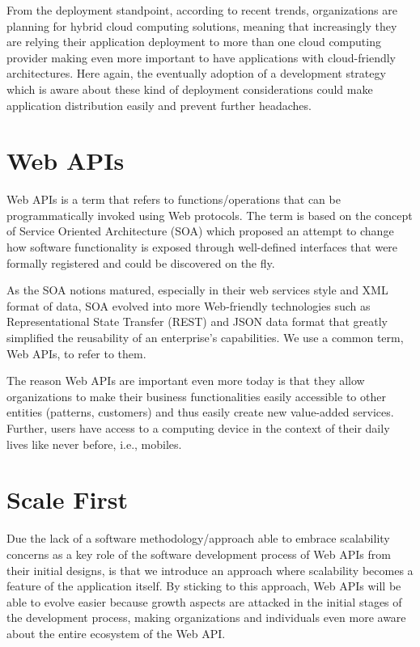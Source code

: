 \documentclass[10pt,article]{IEEEtran}
\begin{document}
From the deployment standpoint, according to recent trends, organizations are planning for hybrid cloud computing solutions, meaning that increasingly they are relying their application deployment to more than one cloud computing provider\cite{rightscale} making even more important to have applications with cloud-friendly architectures. Here again, the eventually adoption of a development strategy which is aware about these kind of deployment considerations could make application distribution easily and prevent further headaches.
 

\section{Web APIs}
Web APIs is a term that refers to functions/operations that can be programmatically invoked using Web protocols. The term is based on the concept of Service Oriented Architecture (SOA) which proposed an attempt to change how software functionality is exposed through well-defined interfaces that were formally registered and could be discovered on the fly.

As the SOA notions matured, especially in their web services style and XML format of data, SOA evolved into more Web-friendly technologies such as Representational State Transfer (REST) and JSON data format that greatly simplified the reusability of an enterprise's capabilities. We use a common term, Web APIs, to refer to them.

The reason Web APIs are important even more today is that they allow organizations to make their business functionalities easily accessible  to  other  entities  (patterns,  customers)  and  thus  easily create new value-added services. Further, users have access to a computing  device  in  the  context  of  their  daily  lives  like  never before, i.e., mobiles.\cite{webapi:definition}

\section{Scale First}
Due the lack of a software methodology/approach able to embrace scalability concerns as a key role of the software development process of Web APIs from their initial designs, is that we introduce an approach where scalability becomes a feature of the application itself. By sticking to this approach, Web APIs will be able to evolve easier because growth aspects are attacked in the initial stages of the development process, making organizations and individuals even more aware about the entire ecosystem of the Web API.
\end{document}
